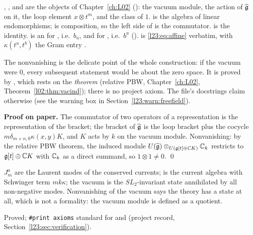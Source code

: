 \begin{dictionary}
, ,  and  are the objects of
Chapter~\ref{ch:L02} (): the vacuum module, the action
of $\widehat{\mathfrak g}$ on it, the loop element $x\otimes t^m$, and the class of $1$.  is
the algebra of linear endomorphisms; \lean{*} is composition, so the left side of  is the
commutator.  is the identity.  is an  for , i.e.\ $b_a$, and
 for , i.e.\ $b^a$ ().
 is \eqref{l23:eq:affine} verbatim, with
$\kappa(t^a,t^b)$ the Gram entry .

The nonvanishing  is the delicate point of the whole construction: if the vacuum were $0$,
every subsequent statement would be about the zero space. It is proved by ,
which rests on the \emph{theorem}  (relative PBW, Chapter~\ref{ch:L02},
Theorem~\ref{l02:thm:vacind}); there is no project axiom. The file's docstrings claim otherwise (see the warning box in Section~\ref{l23:warn:freefield}).
\end{dictionary}

\textbf{Proof on paper.} The commutator of two operators of a representation is the representation of the bracket;
the bracket of $\widehat{\mathfrak g}$ is the loop bracket plus the cocycle $m\delta_{m+n,0}\kappa(x,y)K$, and $K$ acts by
$k$ on the vacuum module. Nonvanishing: by the relative PBW theorem, the induced module
$U(\widehat{\mathfrak g})\otimes_{U(\mathfrak g[t]\oplus{\mathbb{C}} K)}{\mathbb{C}}_k$ restricts to $\mathfrak g[t]\oplus{\mathbb{C}} K$ with ${\mathbb{C}}_k$ as a direct summand, so
$1\otimes1\ne0$. \qed

\begin{physics}
$J^a_m$ are the Laurent modes of the conserved currents;  is the current algebra with Schwinger
term $mk\kappa$; the vacuum is the $SL_2$-invariant state annihilated by all non-negative modes. Nonvanishing of the
vacuum says the theory has a state at all, which is not a formality: the vacuum module is defined as a quotient.
\end{physics}

\begin{status}
Proved; \texttt{\#print axioms} standard for  and  (project record,
Section~\ref{l23:sec:verification}).
\end{status}

